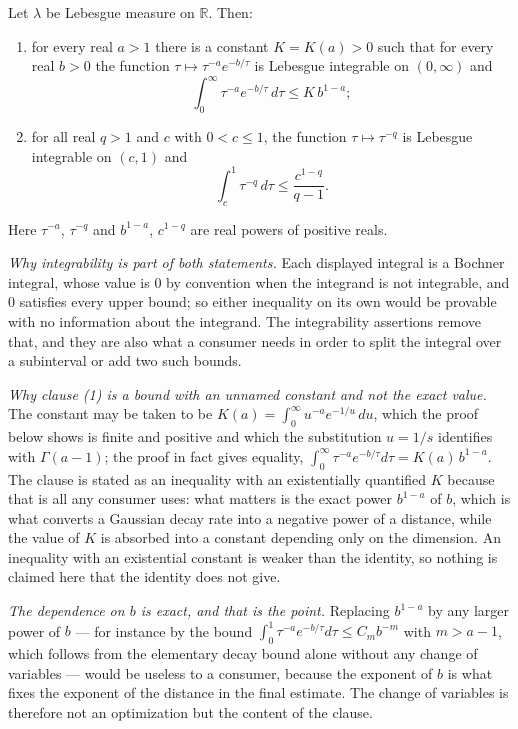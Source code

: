 \begin{lemma}
Let $\lambda$ be Lebesgue measure on $\mathbb{R}$.  Then:
\begin{enumerate}
\item for every real $a > 1$ there is a constant $K = K(a) > 0$ such that for
every real $b > 0$ the function $\tau \mapsto \tau^{-a}e^{-b/\tau}$ is Lebesgue
integrable on $(0,\infty)$ and
\[
  \int_0^\infty \tau^{-a}e^{-b/\tau}\,d\tau \leq K\,b^{1-a} ;
\]
\item for all real $q > 1$ and $c$ with $0 < c \leq 1$, the function
$\tau \mapsto \tau^{-q}$ is Lebesgue integrable on $(c,1)$ and
\[
  \int_c^1 \tau^{-q}\,d\tau \leq \frac{c^{1-q}}{q-1} .
\]
\end{enumerate}
Here $\tau^{-a}$, $\tau^{-q}$ and $b^{1-a}$, $c^{1-q}$ are real powers of
positive reals.

\emph{Why integrability is part of both statements.}  Each displayed integral is
a Bochner integral, whose value is $0$ by convention when the integrand is not
integrable, and $0$ satisfies every upper bound; so either inequality on its own
would be provable with no information about the integrand.  The integrability
assertions remove that, and they are also what a consumer needs in order to
split the integral over a subinterval or add two such bounds.

\emph{Why clause (1) is a bound with an unnamed constant and not the exact
value.}  The constant may be taken to be
$K(a) = \int_0^\infty u^{-a}e^{-1/u}\,du$, which the proof below shows is
finite and positive and which the substitution $u = 1/s$ identifies with
$\Gamma(a-1)$; the proof in fact gives equality,
$\int_0^\infty\tau^{-a}e^{-b/\tau}d\tau = K(a)\,b^{1-a}$.  The clause is stated
as an inequality with an existentially quantified $K$ because that is all any
consumer uses: what matters is the exact power $b^{1-a}$ of $b$, which is what
converts a Gaussian decay rate into a negative power of a distance, while the
value of $K$ is absorbed into a constant depending only on the dimension.  An
inequality with an existential constant is weaker than the identity, so nothing
is claimed here that the identity does not give.

\emph{The dependence on $b$ is exact, and that is the point.}  Replacing
$b^{1-a}$ by any larger power of $b$ --- for instance by the bound
$\int_0^1\tau^{-a}e^{-b/\tau}d\tau \leq C_m b^{-m}$ with $m > a-1$, which
follows from the elementary decay bound alone without any change of variables
--- would be useless to a consumer, because the exponent of $b$ is what fixes
the exponent of the distance in the final estimate.  The change of variables is
therefore not an optimization but the content of the clause.
\end{lemma}
